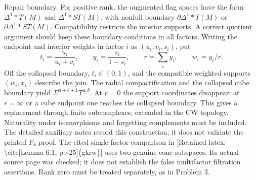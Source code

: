 \documentclass[10pt]{article}
\begin{document}
Repair boundary. For positive rank, the augmented flag spaces have the form \(\Delta^1*T(M)\) and \(\Delta^1*ST(M)\), with nonfull boundary \(\partial\Delta^1*T(M)\) or \(\partial\Delta^1*ST(M)\). Compatibility restricts the interior supports. A correct quotient argument should keep these boundary conditions in all factors. Writing the endpoint and interior weights in factor \(i\) as \((u_i,v_i,s_i)\), put \[t_i=\frac{u_i}{u_i+v_i},\qquad
 y_i=\frac{s_i}{1-s_i},\qquad
 r=\sum_i y_i,\qquad w_i=y_i/r.\] Off the collapsed boundary, \(t_i\in(0,1)\), and the compatible weighted supports \((w_i,x_i)\) describe the join. The radial compactification and the collapsed cube boundary yield \(\Sigma^{a+b+1}T^{a,b}\). At \(r=0\) the support coordinates disappear; at \(r=\infty\) or a cube endpoint one reaches the collapsed boundary. This gives a replacement through finite subcomplexes, extended in the CW topology. Naturality under isomorphisms and forgetting complements must be included. The detailed auxiliary notes record this construction; it does not validate the printed \(F_k\) proof. The cited single-factor comparison in [Retained latex: \textbackslash{}cite[Lemma 6.1, p.\textasciitilde{}25]\{gkrw\}] uses two genuine cone subspaces. Its actual source page was checked; it does not establish the false multifactor filtration assertions. Rank zero must be treated separately, as in Problem 3.\par
\end{document}
